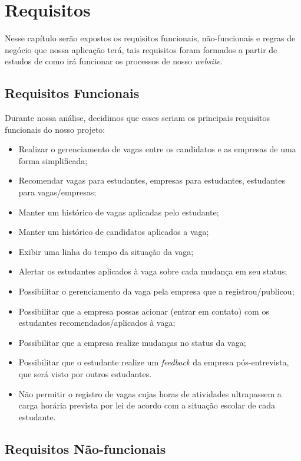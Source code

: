 \chapter{Requisitos}

Nesse capítulo serão expostos os requisitos funcionais, não-funcionais e regras de negócio que nossa aplicação terá, tais requisitos foram formados a partir de estudos de como irá funcionar os processos de nosso \emph{website}.

\section{Requisitos Funcionais}

Durante nossa análise, decidimos que esses seriam os principais requisitos funcionais do nosso projeto:

\begin{itemize}
	\item Realizar o gerenciamento de vagas entre os candidatos e as empresas de uma forma simplificada;
	\item Recomendar vagas para estudantes, empresas para estudantes, estudantes para vagas/empresas;
	\item Manter um histórico de vagas aplicadas pelo estudante;
	\item Manter um histórico de candidatos aplicados a vaga;
	\item Exibir uma linha do tempo da situação da vaga;
	\item Alertar os estudantes aplicados à vaga sobre cada mudança em seu status;
	\item Possibilitar o gerenciamento da vaga pela empresa que a registrou/publicou;
	\item Possibilitar que a empresa possas acionar (entrar em contato) com os estudantes recomendados/aplicados à vaga;
	\item Possibilitar que a empresa realize mudanças no status da vaga;
	\item Possibilitar que o estudante realize um \emph{feedback} da empresa pós-entrevista, que será visto por outros estudantes.
	\item Não permitir o registro de vagas cujas horas de atividades ultrapassem a carga horária prevista por lei de acordo com a situação escolar de cada estudante.
\end{itemize}

\section{Requisitos Não-funcionais}

